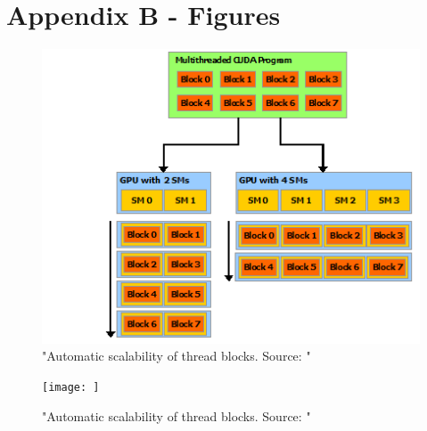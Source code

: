\newpage
\section*{Appendix B - Figures}

\begin{figure}[ht]
\includegraphics[width=\textwidth]{Documents/Report/Figures/Automatic scalability.png}
\caption{"Automatic scalability of thread blocks. Source: \cite[Figure 3]{nvidia:cudadoc}"}
\label{fig:automatic scalability}
\end{figure}

\begin{figure}[ht]
\texttt{[image: ]}
\caption{"Automatic scalability of thread blocks. Source: \cite[Figure 3]{nvidia:cudadoc}"}
\label{fig:automatic scalability}
\end{figure}

